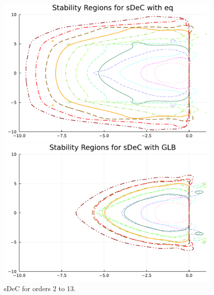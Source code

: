 \begin{figure}
	\centering
	\begin{minipage}[t]{0.45\textwidth}
		\includegraphics[width=\textwidth]{pdf/odepics/sDeC_eq_ord13.pdf}
	\end{minipage}
	\begin{minipage}[t]{0.45\textwidth}
		\includegraphics[width=\textwidth]{pdf/odepics/sDeC_GLB_ord13.pdf}
	\end{minipage}
	\caption{sDeC for orders 2 to 13.}
	\label{fig: ODEEXsDeC}
\end{figure}

